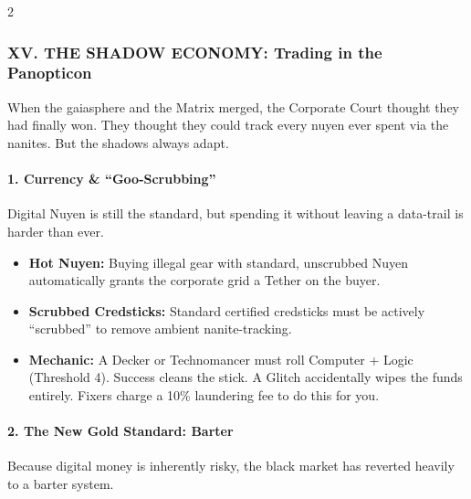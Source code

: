 \documentclass[
  oneside]{article}
\providecommand{\tightlist}{%
  \setlength{\itemsep}{0pt}\setlength{\parskip}{0pt}}
\begin{document}
\begin{multicols}{2}
\hypertarget{xv.-the-shadow-economy-trading-in-the-panopticon}{%
\subsubsection{XV. THE SHADOW ECONOMY: Trading in
the
Panopticon}\label{xv.-the-shadow-economy-trading-in-the-panopticon}}

When the gaiasphere and the Matrix merged, the
Corporate Court thought they had finally won. They
thought they could track every nuyen ever spent
via the nanites. But the shadows always adapt.

\hypertarget{currency-goo-scrubbing}{%
\paragraph{1. Currency \&
``Goo-Scrubbing''}\label{currency-goo-scrubbing}}

Digital Nuyen is still the standard, but spending
it without leaving a data-trail is harder than
ever.

\begin{itemize}
\tightlist
\item
  \textbf{Hot Nuyen:} Buying illegal gear with
  standard, unscrubbed Nuyen automatically grants
  the corporate grid a Tether on the buyer.
\item
  \textbf{Scrubbed Credsticks:} Standard certified
  credsticks must be actively ``scrubbed'' to
  remove ambient nanite-tracking.
\item
  \textbf{Mechanic:} A Decker or Technomancer must
  roll Computer + Logic (Threshold 4). Success
  cleans the stick. A Glitch accidentally wipes
  the funds entirely. Fixers charge a 10\%
  laundering fee to do this for you.
\end{itemize}

\hypertarget{the-new-gold-standard-barter}{%
\paragraph{2. The New Gold Standard:
Barter}\label{the-new-gold-standard-barter}}

Because digital money is inherently risky, the
black market has reverted heavily to a barter
system.

\end{multicols}
\end{document}

